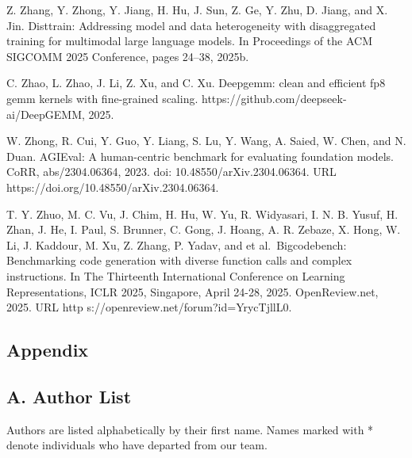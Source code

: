 \documentclass[
  10
]{article}
\begin{document}
Z. Zhang, Y. Zhong, Y. Jiang, H. Hu, J. Sun, Z. Ge, Y. Zhu, D. Jiang,
and X. Jin. Disttrain: Addressing model and data heterogeneity with
disaggregated training for multimodal large language models. In
Proceedings of the ACM SIGCOMM 2025 Conference, pages 24--38, 2025b.

C. Zhao, L. Zhao, J. Li, Z. Xu, and C. Xu. Deepgemm: clean and efficient
fp8 gemm kernels with fine-grained scaling.
https://github.com/deepseek-ai/DeepGEMM, 2025.

W. Zhong, R. Cui, Y. Guo, Y. Liang, S. Lu, Y. Wang, A. Saied, W. Chen,
and N. Duan. AGIEval: A human-centric benchmark for evaluating
foundation models. CoRR, abs/2304.06364, 2023. doi:
10.48550/arXiv.2304.06364. URL
https://doi.org/10.48550/arXiv.2304.06364.

T. Y. Zhuo, M. C. Vu, J. Chim, H. Hu, W. Yu, R. Widyasari, I. N. B.
Yusuf, H. Zhan, J. He, I. Paul, S. Brunner, C. Gong, J. Hoang, A. R.
Zebaze, X. Hong, W. Li, J. Kaddour, M. Xu, Z. Zhang, P. Yadav, and et
al.~Bigcodebench: Benchmarking code generation with diverse function
calls and complex instructions. In The Thirteenth International
Conference on Learning Representations, ICLR 2025, Singapore, April
24-28, 2025. OpenReview.net, 2025. URL http
s://openreview.net/forum?id=YrycTjllL0.

\subsection{Appendix}\label{appendix}

\subsection{A. Author List}\label{a.-author-list}

Authors are listed alphabetically by their first name. Names marked with
* denote individuals who have departed from our team.
\end{document}
